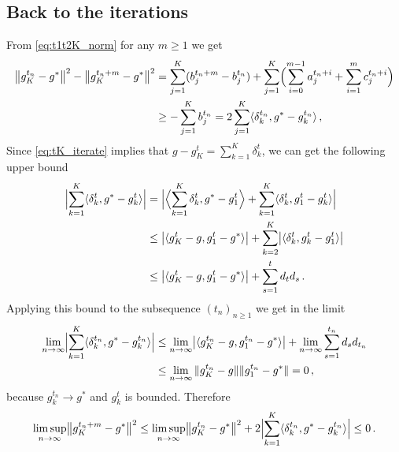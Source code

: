 \documentclass[a4paper]{article}
\begin{document}
\subsection*{Back to the iterations} %
\label{sub:back_to_the_iterations}

From \eqref{eq:t1t2K_norm} for any $m \geq 1$ we get
\begin{align*}
  \bigl \| g^{t_n}_K - g^* \bigr \|^2 - \bigl \| g^{t_n+m}_K - g^* \bigr \|^2
    &= \sum_{j=1}^K (b^{t_n+m}_j - b^{t_n}_j)
        + \sum_{j=1}^K \Bigl(
          \sum_{i=0}^{m-1} a^{t_n+i}_j
          + \sum_{i=1}^m c^{t_n+i}_j
      \Bigr)
      \\
    &\geq - \sum_{j=1}^K b^{t_n}_j
      = 2 \sum_{j=1}^K \langle \delta^{t_n}_k, g^* - g^{t_n}_k \rangle
    \,,
\end{align*}
Since \eqref{eq:tK_iterate} implies that $g - g^t_K = \sum_{k=1}^K \delta^t_k$, we
can get the following upper bound
\begin{align*}
  \Bigl \lvert \sum_{k=1}^K \langle \delta^t_k, g^* - g^t_k \rangle \Bigr \rvert
    &= \Bigl \lvert
      \Bigl\langle \sum_{k=1}^K \delta^t_k, g^* - g^t_1 \Bigr \rangle
      + \sum_{k=1}^K \langle \delta^t_k, g^t_1 - g^t_k \rangle
      \Bigr \rvert
      \\
    &\leq \bigl\lvert \langle g^t_K - g, g^t_1 - g^* \rangle \bigr\rvert 
      + \sum_{k=2}^K \bigl\lvert \langle \delta^t_k, g^t_k - g^t_1 \rangle \bigr\rvert 
      \\
    &\leq \bigl\lvert \langle g^t_K - g, g^t_1 - g^* \rangle \bigr\rvert 
      + \sum_{s=1}^t d_t d_s
      \,.
\end{align*}
Applying this bound to the subsequence $(t_n)_{n\geq1}$ we get in the limit
\begin{align*}
  \lim_{n\to \infty}
    \Bigl \lvert \sum_{k=1}^K \langle \delta^{t_n}_k, g^* - g^{t_n}_k \rangle \Bigr \rvert
    &\leq \lim_{n\to \infty}
      \bigl\lvert \langle g^{t_n}_K - g, g^{t_n}_1 - g^* \rangle \bigr\rvert
      + \lim_{n\to \infty} \sum_{s=1}^{t_n} d_s d_{t_n}
      \\
    &\leq \lim_{n\to \infty} \|g^{t_n}_K - g\| \|g^{t_n}_1 - g^* \|
      = 0
    \,,
\end{align*}
because $g^{t_n}_k \to g^*$ and $g^t_k$ is bounded. Therefore 
\begin{equation*}
  \limsup_{n\to\infty} \bigl \| g^{t_n+m}_K - g^* \bigr \|^2
    \leq \limsup_{n\to\infty} \bigl \| g^{t_n}_K - g^* \bigr \|^2
      + 2 \Bigl \lvert \sum_{k=1}^K \langle \delta^{t_n}_k, g^* - g^{t_n}_k \rangle \Bigr \rvert
    \leq 0
    \,.
\end{equation*}
\end{document}
